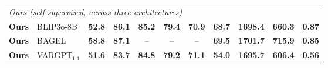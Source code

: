 \begin{table}[!htb]
{\begin{tabular}{@{}llcccccccc|c@{}}
    \midrule
    \multicolumn{11}{l}{\emph{Ours (self-supervised, across three architectures)}} \\
    \textbf{Ours} & BLIP3o-8B & \textbf{52.8} & \textbf{86.1} & \textbf{85.2} & \textbf{79.4} & \textbf{70.9} & \textbf{68.7} & \textbf{1698.4} & \textbf{660.3} & \textbf{0.87} \\
    \textbf{Ours} & BAGEL & \textbf{58.8} & \textbf{87.1} & -- & -- & -- & \textbf{69.5} & \textbf{1701.7} & \textbf{715.9} & \textbf{0.85} \\
    \textbf{Ours} & VARGPT$_{1.1}$ & \textbf{51.6} & \textbf{83.7} & \textbf{84.8} & \textbf{79.2} & \textbf{71.1} & \textbf{54.0} & \textbf{1695.7} & \textbf{606.4} & \textbf{0.56} \\
    \bottomrule
  \end{tabular}%
  }
\end{table}
